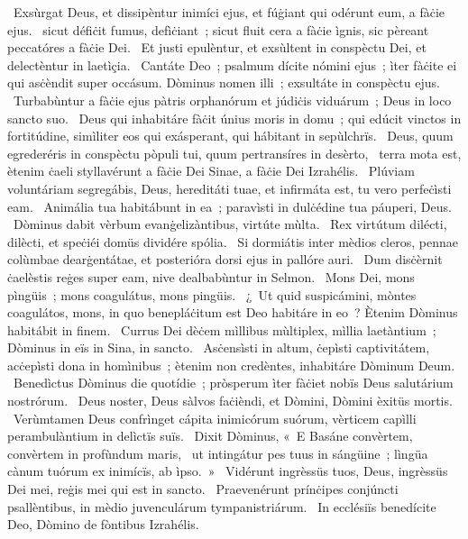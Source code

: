 ~Exsùrgat Deus, et dissipèntur inimíci ejus, et fúġiant qui odérunt eum, a fàċie ejus. 
~sicut défiċit fumus, defìċiant~; sicut fluit cera a fàċie ìgnis, sic pèreant peccatóres a fàċie Dei. 
~Et justi epulèntur, et exsùltent in conspèctu Dei, et delectèntur in laetìçia. 
~Cantáte Deo~; psalmum dícite nómini ejus~; ìter fàċite ei qui asċèndit super occásum. Dòminus nomen illi~; exsultáte in conspèctu ejus. 
~Turbabùntur a fàċie ejus pàtris orphanórum et júdiċis viduárum~; Deus in loco sancto suo. 
~Deus qui inhabitáre fàċit únius moris in domu~; qui edúcit vinctos in fortitúdine, simìliter eos qui exásperant, qui hábitant in sepùlchrïs. 
~Deus, quum egrederéris in conspèctu pòpuli tui, quum pertransíres in desèrto, 
~terra mota est, ètenim ċaeli styllavérunt a fàċie Dei Sinae, a fàċie Dei Izrahélis. 
~Plúviam voluntáriam segregábis, Deus, hereditáti tuae, et infirmáta est, tu vero perfeċìsti eam. 
~Animália tua habitábunt in ea~; paravìsti in dulċédine tua páuperi, Deus. 
~Dòminus dabit vèrbum evanġelizàntibus, virtúte mùlta. 
~Rex virtútum dilécti, dilècti, et speċiéi domüs dividére spólia. 
~Si dormiátis inter mèdios cleros, pennae colùmbae dearġentátae, et posterióra dorsi ejus in pallóre auri. 
~Dum disċèrnit ċaelèstis reġes super eam, nive dealbabùntur in Selmon. 
~Mons Dei, mons pìngüis~; mons coagulátus, mons pingüis. 
~¿~Ut quid suspicámini, mòntes coagulátos, mons, in quo benepláċitum est Deo habitáre in eo~? Ètenim Dòminus habitábit in finem. 
~Currus Dei dèċem mìllibus mùltiplex, mìllia laetàntium~; Dòminus in eïs in Sina, in sancto. 
~Asċensìsti in altum, ċepìsti captivitátem, acċepìsti dona in homìnibus~; ètenim non credèntes, inhabitáre Dòminum Deum. 
~Benedìctus Dòminus die quotídie~; pròsperum ìter fàċiet nobïs Deus salutárium nostrórum. 
~Deus noster, Deus sàlvos faċièndi, et Dòmini, Dòmini èxitüs mortis. 
~Verùmtamen Deus confrìnget cápita inimicórum suórum, vèrticem capìlli perambulàntium in delìctïs suïs. 
~Dixit Dòminus, «~E Basáne convèrtem, convèrtem in profùndum maris, 
~ut intingátur pes tuus in sángüine~; lìngüa cànum tuórum ex inimícïs, ab ìpso.~»
~Vidérunt ingrèssüs tuos, Deus, ingrèssüs Dei mei, reġis mei qui est in sancto. 
~Praevenérunt prínċipes conjúncti psallèntibus, in mèdio juvenculárum tympanistriárum. 
~In ecclésiïs benedícite Deo, Dòmino de fòntibus Izrahélis. 
